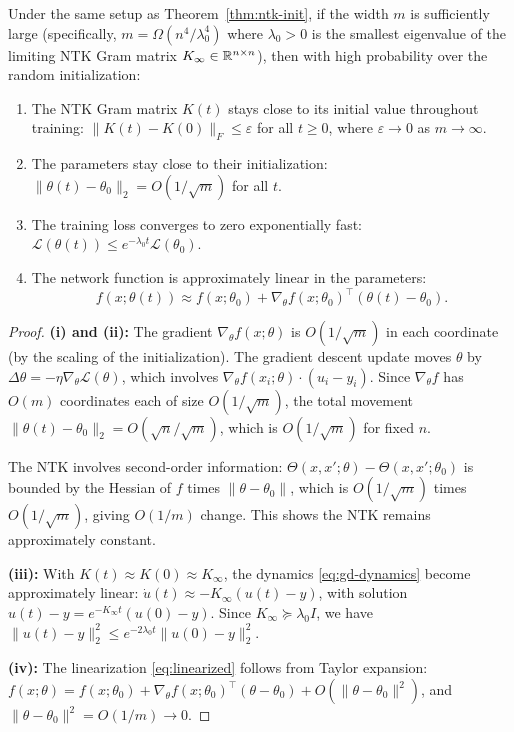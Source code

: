 \documentclass[11pt,a4paper]{article}
\begin{document}
\begin{theorem}
\label{thm:lazy}
Under the same setup as Theorem~\ref{thm:ntk-init}, if the width
$m$ is sufficiently large (specifically, $m = \Omega(n^4 / \lambda_0^4)$
where $\lambda_0 > 0$ is the smallest eigenvalue of the limiting NTK
Gram matrix $K_\infty \in \mathbb{R}^{n \times n}$), then with high
probability over the random initialization:
\begin{enumerate}[nosep,label=(\roman*)]
  \item The NTK Gram matrix $K(t)$ stays close to its initial value
    throughout training:
    $\|K(t) - K(0)\|_F \le \varepsilon$ for all $t \ge 0$, where
    $\varepsilon \to 0$ as $m \to \infty$.
  \item The parameters stay close to their initialization:
    $\|\theta(t) - \theta_0\|_2 = O(1/\sqrt{m})$ for all $t$.
  \item The training loss converges to zero exponentially fast:
    $\mathcal{L}(\theta(t)) \le e^{-\lambda_0 t} \mathcal{L}(\theta_0)$.
  \item The network function is approximately linear in the
    parameters:
    \begin{equation}
    \label{eq:linearized}
      f(x; \theta(t)) \approx f(x; \theta_0) +
      \nabla_\theta f(x; \theta_0)^\top (\theta(t) - \theta_0).
    \end{equation}
\end{enumerate}
\end{theorem}

\begin{proof}
\textbf{(i) and (ii):} The gradient $\nabla_\theta f(x; \theta)$ is
$O(1/\sqrt{m})$ in each coordinate (by the scaling of the
initialization).  The gradient descent update moves $\theta$ by
$\Delta\theta = -\eta \nabla_\theta \mathcal{L}(\theta)$, which
involves $\nabla_\theta f(x_i; \theta) \cdot (u_i - y_i)$.  Since
$\nabla_\theta f$ has $O(m)$ coordinates each of size $O(1/\sqrt{m})$,
the total movement $\|\theta(t) - \theta_0\|_2 = O(\sqrt{n}/\sqrt{m})$,
which is $O(1/\sqrt{m})$ for fixed $n$.

The NTK involves second-order information: $\Theta(x, x'; \theta)
- \Theta(x, x'; \theta_0)$ is bounded by the Hessian of $f$ times
$\|\theta - \theta_0\|$, which is $O(1/\sqrt{m})$ times
$O(1/\sqrt{m})$, giving $O(1/m)$ change.  This shows the NTK
remains approximately constant.

\textbf{(iii):}  With $K(t) \approx K(0) \approx K_\infty$, the
dynamics \eqref{eq:gd-dynamics} become approximately linear:
$\dot{u}(t) \approx -K_\infty(u(t) - y)$, with solution
$u(t) - y = e^{-K_\infty t}(u(0) - y)$.  Since $K_\infty \succeq
\lambda_0 I$, we have $\|u(t) - y\|_2^2 \le e^{-2\lambda_0 t}
\|u(0) - y\|_2^2$.

\textbf{(iv):}  The linearization \eqref{eq:linearized} follows from
Taylor expansion: $f(x; \theta) = f(x; \theta_0) +
\nabla_\theta f(x; \theta_0)^\top (\theta - \theta_0) + O(\|\theta
- \theta_0\|^2)$, and $\|\theta - \theta_0\|^2 = O(1/m) \to 0$.
\end{proof}
\end{document}
